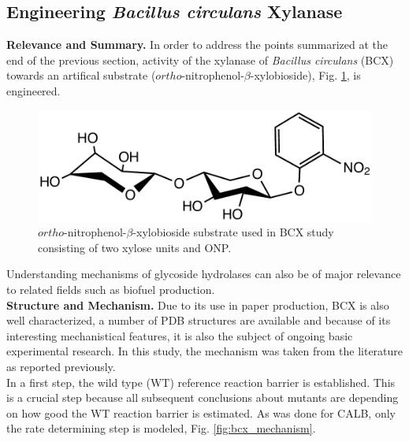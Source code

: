 \subsection{Engineering \textit{Bacillus circulans} Xylanase}
\textbf{Relevance and Summary.}
In order to address the points summarized at the end of the previous section, activity of the xylanase of \textit{Bacillus circulans} (BCX) towards an artifical substrate ($ortho$-nitrophenol-$\beta$-xylobioside), Fig. \ref{fig:substrate}, is engineered.
\begin{figure}[htbp] 
\centering
\includegraphics[width=0.85\linewidth]{substrate.pdf}
\caption{
$ortho$-nitrophenol-$\beta$-xylobioside substrate used in BCX study consisting of two xylose units and ONP.
}
\label{fig:substrate}
\end{figure}
Understanding mechanisms of glycoside hydrolases can also be of major relevance to related fields such as biofuel production\cite{ragauskas2006path, yeoman2010thermostable, zhang2011vital, gao2013increased}.\\
\textbf{Structure and Mechanism.}
Due to its use in paper production\cite{bajpai1999application, buchert1994application}, BCX is also well characterized, a number of PDB structures are available and because of its interesting mechanistical features, it is also the subject of ongoing basic experimental research\cite{ludwiczek2013strategies}.
In this study, the mechanism was taken from the literature as reported previously\cite{joshi2000hydrogen,joshi2001dissecting}.\\
In a first step, the wild type (WT) reference reaction barrier is established.
This is a crucial step because all subsequent conclusions about mutants are depending on how good the WT reaction barrier is estimated.
As was done for CALB, only the rate determining step is modeled, Fig. \ref{fig:bcx_mechanism}.
